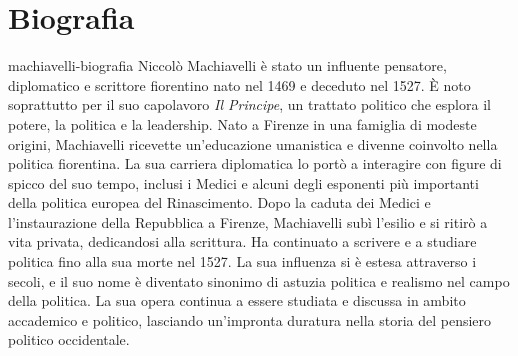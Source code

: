 \documentclass[preview]{standalone}
\begin{document}
\genpage

\section{Biografia}

\begin{snippet}{machiavelli-biografia}
    Niccolò Machiavelli è stato un influente pensatore, diplomatico e scrittore fiorentino nato nel 1469 e deceduto nel 1527. È noto soprattutto per il suo capolavoro \textit{Il Principe}, un trattato politico che esplora il potere, la politica e la leadership.
    Nato a Firenze in una famiglia di modeste origini, Machiavelli ricevette un'educazione umanistica e divenne coinvolto nella politica fiorentina. La sua carriera diplomatica lo portò a interagire con figure di spicco del suo tempo, inclusi i Medici e alcuni degli esponenti più importanti della politica europea del Rinascimento.
    Dopo la caduta dei Medici e l'instaurazione della Repubblica a Firenze, Machiavelli subì l'esilio e si ritirò a vita privata, dedicandosi alla scrittura. Ha continuato a scrivere e a studiare politica fino alla sua morte nel 1527.
    La sua influenza si è estesa attraverso i secoli, e il suo nome è diventato sinonimo di astuzia politica e realismo nel campo della politica. La sua opera continua a essere studiata e discussa in ambito accademico e politico, lasciando un'impronta duratura nella storia del pensiero politico occidentale.
\end{snippet}
\end{document}
